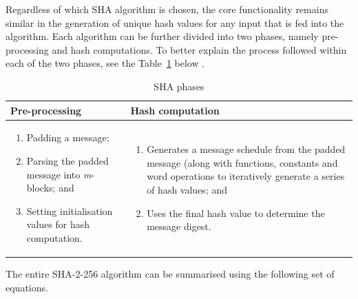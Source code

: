     Regardless of which SHA algorithm is chosen, the core functionality remains similar in the generation of unique hash values for any input that is fed into the algorithm. Each algorithm can be further divided into two phases, namely pre-processing and hash computations. To better explain the process followed within each of the two phases, see the Table~\ref{table: SHA phases} below \citep{Foti2015}.
    
    
    \begin{table}[h]
        \caption{SHA phases}
        \begin{tabular}{|p{} | p{}|}
          \hline
         \textbf{Pre-processing} & \textbf{Hash computation} \\
         \hline\hline
            \begin{enumerate}
                \item Padding a message;
                \item Parsing the padded message into \newline \textit{m}-blocks; and
                \item Setting initialisation values for hash computation.
            \end{enumerate}
             & 
             \begin{enumerate}
                 \item Generates a message schedule from the padded message (along with functions, constants and word operations to iteratively generate a series of hash values; and
                 \item Uses the final hash value to determine the message digest.
             \end{enumerate} \\
             \hline
        \end{tabular}
        \label{table: SHA phases}
    \end{table}
    
    The entire SHA-2-256 algorithm can be summarised using the following set of equations.
    
    
